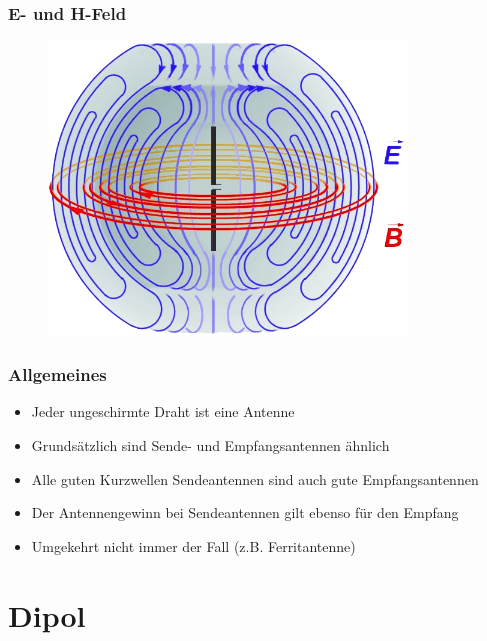\begin{frame}
  \frametitle{E- und H-Feld}
  \begin{center}
    \begin{figure}
      \includegraphics[width=0.85\textwidth,height=.75\textheight,keepaspectratio]{e11/Felder_um_Dipol.png}
    \end{figure}
  \end{center}
\end{frame}

\begin{frame}
  \frametitle{Allgemeines}
  \begin{itemize}
    \item Jeder ungeschirmte Draht ist eine Antenne
    \item Grundsätzlich sind Sende- und Empfangsantennen ähnlich
    \item Alle guten Kurzwellen Sendeantennen sind auch gute Empfangsantennen
    \item Der Antennengewinn bei Sendeantennen gilt ebenso für den Empfang
    \item Umgekehrt nicht immer der Fall (z.B. Ferritantenne)
  \end{itemize}
\end{frame}

\section*{Dipol}

